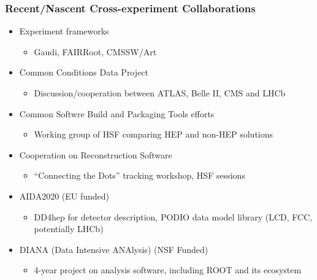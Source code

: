 \begin{frame}
\frametitle{Recent/Nascent Cross-experiment Collaborations}

\begin{itemize}
\item Experiment frameworks
  \begin{itemize}
  \item Gaudi, FAIRRoot, CMSSW/Art
  \end{itemize}
\item Common Conditions Data Project
  \begin{itemize}
  \item Discussion/cooperation between ATLAS, Belle II, CMS and LHCb
  \end{itemize}
\item Common Softwre Build and Packaging Tools efforts
  \begin{itemize}
  \item Working group of HSF comparing HEP and non-HEP solutions
  \end{itemize}
\item Cooperation on Reconstruction Software
  \begin{itemize}
  \item ``Connecting the Dots'' tracking workshop, HSF sessions 
  \end{itemize}
\item AIDA2020 (EU funded)
  \begin{itemize}
  \item DD4hep for detector description, PODIO data model library (LCD, FCC, potentially LHCb)
  \end{itemize}
\item DIANA (Data Intensive ANAlysis) (NSF Funded)
  \begin{itemize}
  \item 4-year project on analysis software, including ROOT and its ecosystem
  \end{itemize}
\end{itemize}

\end{frame}


